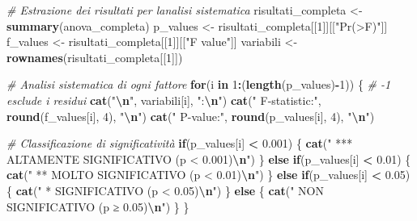 \documentclass[
]{article}
\newenvironment{Shaded}{\begin{snugshade}}{\end{snugshade}}
\newcommand{\CommentTok}[1]{\textcolor[rgb]{0.56,0.35,0.01}{\textit{#1}}}
\newcommand{\ControlFlowTok}[1]{\textcolor[rgb]{0.13,0.29,0.53}{\textbf{#1}}}
\newcommand{\DecValTok}[1]{\textcolor[rgb]{0.00,0.00,0.81}{#1}}
\newcommand{\FloatTok}[1]{\textcolor[rgb]{0.00,0.00,0.81}{#1}}
\newcommand{\FunctionTok}[1]{\textcolor[rgb]{0.13,0.29,0.53}{\textbf{#1}}}
\newcommand{\NormalTok}[1]{#1}
\newcommand{\OtherTok}[1]{\textcolor[rgb]{0.56,0.35,0.01}{#1}}
\newcommand{\SpecialCharTok}[1]{\textcolor[rgb]{0.81,0.36,0.00}{\textbf{#1}}}
\newcommand{\StringTok}[1]{\textcolor[rgb]{0.31,0.60,0.02}{#1}}
\begin{document}
\begin{Shaded}
\begin{Highlighting}[]
\CommentTok{\# Estrazione dei risultati per l\textquotesingle{}analisi sistematica}
\NormalTok{risultati\_completa }\OtherTok{\textless{}{-}} \FunctionTok{summary}\NormalTok{(anova\_completa)}
\NormalTok{p\_values }\OtherTok{\textless{}{-}}\NormalTok{ risultati\_completa[[}\DecValTok{1}\NormalTok{]][[}\StringTok{"Pr(\textgreater{}F)"}\NormalTok{]]}
\NormalTok{f\_values }\OtherTok{\textless{}{-}}\NormalTok{ risultati\_completa[[}\DecValTok{1}\NormalTok{]][[}\StringTok{"F value"}\NormalTok{]]}
\NormalTok{variabili }\OtherTok{\textless{}{-}} \FunctionTok{rownames}\NormalTok{(risultati\_completa[[}\DecValTok{1}\NormalTok{]])}

\CommentTok{\# Analisi sistematica di ogni fattore}
\ControlFlowTok{for}\NormalTok{(i }\ControlFlowTok{in} \DecValTok{1}\SpecialCharTok{:}\NormalTok{(}\FunctionTok{length}\NormalTok{(p\_values)}\SpecialCharTok{{-}}\DecValTok{1}\NormalTok{)) \{  }\CommentTok{\# {-}1 esclude i residui}
  \FunctionTok{cat}\NormalTok{(}\StringTok{"}\SpecialCharTok{\textbackslash{}n}\StringTok{"}\NormalTok{, variabili[i], }\StringTok{":}\SpecialCharTok{\textbackslash{}n}\StringTok{"}\NormalTok{)}
  \FunctionTok{cat}\NormalTok{(}\StringTok{"  F{-}statistic:"}\NormalTok{, }\FunctionTok{round}\NormalTok{(f\_values[i], }\DecValTok{4}\NormalTok{), }\StringTok{"}\SpecialCharTok{\textbackslash{}n}\StringTok{"}\NormalTok{)}
  \FunctionTok{cat}\NormalTok{(}\StringTok{"  P{-}value:"}\NormalTok{, }\FunctionTok{round}\NormalTok{(p\_values[i], }\DecValTok{4}\NormalTok{), }\StringTok{"}\SpecialCharTok{\textbackslash{}n}\StringTok{"}\NormalTok{)}
  
  
\CommentTok{\# Classificazione di significatività  }
  \ControlFlowTok{if}\NormalTok{(p\_values[i] }\SpecialCharTok{\textless{}} \FloatTok{0.001}\NormalTok{) \{}
    \FunctionTok{cat}\NormalTok{(}\StringTok{"  *** ALTAMENTE SIGNIFICATIVO (p \textless{} 0.001)}\SpecialCharTok{\textbackslash{}n}\StringTok{"}\NormalTok{)}
\NormalTok{  \} }\ControlFlowTok{else} \ControlFlowTok{if}\NormalTok{(p\_values[i] }\SpecialCharTok{\textless{}} \FloatTok{0.01}\NormalTok{) \{}
    \FunctionTok{cat}\NormalTok{(}\StringTok{"  ** MOLTO SIGNIFICATIVO (p \textless{} 0.01)}\SpecialCharTok{\textbackslash{}n}\StringTok{"}\NormalTok{)}
\NormalTok{  \} }\ControlFlowTok{else} \ControlFlowTok{if}\NormalTok{(p\_values[i] }\SpecialCharTok{\textless{}} \FloatTok{0.05}\NormalTok{) \{}
    \FunctionTok{cat}\NormalTok{(}\StringTok{"  * SIGNIFICATIVO (p \textless{} 0.05)}\SpecialCharTok{\textbackslash{}n}\StringTok{"}\NormalTok{)}
\NormalTok{  \} }\ControlFlowTok{else}\NormalTok{ \{}
    \FunctionTok{cat}\NormalTok{(}\StringTok{"  NON SIGNIFICATIVO (p ≥ 0.05)}\SpecialCharTok{\textbackslash{}n}\StringTok{"}\NormalTok{)}
\NormalTok{  \}}
\NormalTok{\}}
\end{Highlighting}
\end{Shaded}
\end{document}
